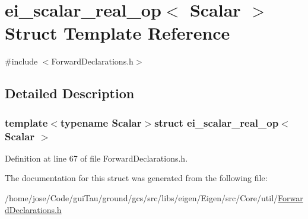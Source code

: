 \hypertarget{structei__scalar__real__op}{\section{ei\-\_\-scalar\-\_\-real\-\_\-op$<$ Scalar $>$ Struct Template Reference}
\label{structei__scalar__real__op}
}


{\ttfamily \#include $<$Forward\-Declarations.\-h$>$}



\subsection{Detailed Description}
\subsubsection*{template$<$typename Scalar$>$struct ei\-\_\-scalar\-\_\-real\-\_\-op$<$ Scalar $>$}



Definition at line 67 of file Forward\-Declarations.\-h.



The documentation for this struct was generated from the following file\-:\begin{DoxyCompactItemize}
\item 
/home/jose/\-Code/gui\-Tau/ground/gcs/src/libs/eigen/\-Eigen/src/\-Core/util/\hyperlink{_forward_declarations_8h}{Forward\-Declarations.\-h}\end{DoxyCompactItemize}
